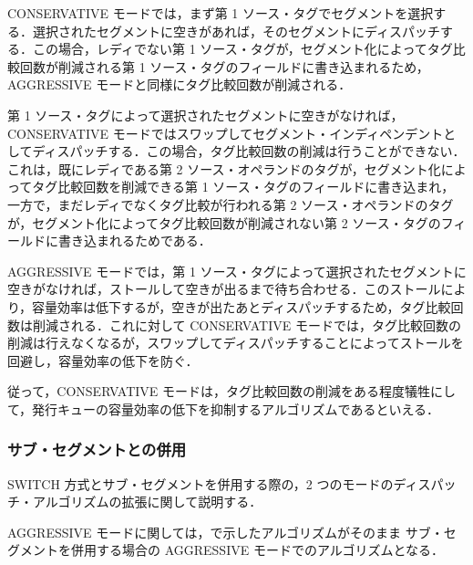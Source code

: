 CONSERVATIVE モードでは，まず第 1 ソース・タグでセグメントを選択する．選択されたセグメントに空きがあれば，そのセグメントにディスパッチする．この場合，レディでない第 1 ソース・タグが，セグメント化によってタグ比較回数が削減される第 1 ソース・タグのフィールドに書き込まれるため，AGGRESSIVE モードと同様にタグ比較回数が削減される．

第 1 ソース・タグによって選択されたセグメントに空きがなければ，CONSERVATIVE モードではスワップしてセグメント・インディペンデントとしてディスパッチする．この場合，タグ比較回数の削減は行うことができない．これは，既にレディである第 2 ソース・オペランドのタグが，セグメント化によってタグ比較回数を削減できる第 1 ソース・タグのフィールドに書き込まれ，一方で，まだレディでなくタグ比較が行われる第 2 ソース・オペランドのタグが，セグメント化によってタグ比較回数が削減されない第 2 ソース・タグのフィールドに書き込まれるためである．

AGGRESSIVE モードでは，第 1 ソース・タグによって選択されたセグメントに空きがなければ，ストールして空きが出るまで待ち合わせる．このストールにより，容量効率は低下するが，空きが出たあとディスパッチするため，タグ比較回数は削減される．これに対して CONSERVATIVE モードでは，タグ比較回数の削減は行えなくなるが，スワップしてディスパッチすることによってストールを回避し，容量効率の低下を防ぐ．

従って，CONSERVATIVE モードは，タグ比較回数の削減をある程度犠牲にして，発行キューの容量効率の低下を抑制するアルゴリズムであるといえる．

\subsubsection{サブ・セグメントとの併用}
SWITCH 方式とサブ・セグメントを併用する際の，2 つのモードのディスパッチ・アルゴリズムの拡張に関して説明する．

AGGRESSIVE モードに関しては，で示したアルゴリズムがそのまま サブ・セグメントを併用する場合の AGGRESSIVE モードでのアルゴリズムとなる．

